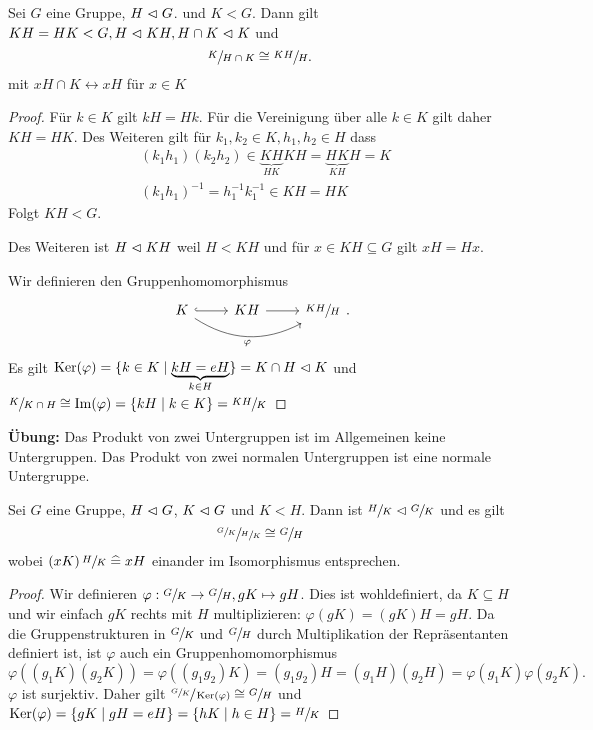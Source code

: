 \begin{corollary}
	Sei $G$ eine Gruppe, $H \vartriangleleft G$. und $K < G$.
	Dann gilt $K H = H K < G, H \vartriangleleft KH, H \cap K \vartriangleleft K $ und 
	\[
	\sfrac{K}{H \cap K} \cong \sfrac{KH}{H}
	.\] 
	mit $x H \cap K \leftrightarrow x H$ für $x \in K$
\end{corollary}

\begin{proof}
	Für $k \in K$ gilt $kH = Hk$. 
	Für die Vereinigung über alle $k \in K$ gilt daher $KH = HK$.
	Des Weiteren gilt für  $k_1, k_2 \in K, h_1,h_2 \in H$ dass
	\begin{align*}
		&(k_1 h_1) (k_2 h_2) \in \underbrace{KH}_{HK} KH = \underbrace{HK}_{KH} H = K\\
		&(k_1 h_1)^{-1} = h_1^{-1} k_1^{-1} \in KH = HK
	\end{align*}
	Folgt $KH < G$.

	Des Weiteren ist $H \vartriangleleft KH$ weil $H < KH$ und für $x \in KH \subseteq G$ gilt $xH = Hx$.

	Wir definieren den Gruppenhomomorphismus
	\[
		\begin{tikzcd}
			K \arrow[r, hook] \arrow[rr, "\varphi"', bend right] & KH \arrow[r] & \sfrac{KH}{H}
		\end{tikzcd}
	.\] 
	Es gilt $\operatorname{Ker}(\varphi) = \{k \in K \mid \underbrace{k H = e H}_{k \in H}\} = K \cap H \vartriangleleft K$
	und $\sfrac{K}{K \cap H} \cong \Im(\varphi) = \{k H \mid k \in K\}  = \sfrac{KH}{K}$
\end{proof}

\textbf{Übung:}
 Das Produkt von zwei Untergruppen ist im Allgemeinen keine Untergruppen.
 Das Produkt von zwei normalen Untergruppen ist eine normale Untergruppe.

 \begin{corollary}
 	Sei $G$ eine Gruppe, $H \vartriangleleft G$, $K \vartriangleleft G$ und $K < H$.
	Dann ist $\sfrac{H}{K} \vartriangleleft \sfrac{G}{K}$ und es gilt
	\[
	\sfrac{\sfrac{G}{K}}{\sfrac{H}{K}} \cong \sfrac{G}{H}
	\] 
	wobei $(xK) \, \sfrac{H}{K} \; \widehat{=} \; x H$ einander im Isomorphismus entsprechen.
 \end{corollary}

\begin{proof}
	Wir definieren $ \varphi: \sfrac{G}{K} \to  \sfrac{G}{H}, gK \mapsto gH$.
	Dies ist wohldefiniert, da $K \subseteq H$ und wir einfach $gK$ rechts mit $H$ multiplizieren:
	$\varphi(gK) = (gK)H = gH$.
	Da die Gruppenstrukturen in $\sfrac{G}{K}$ und $\sfrac{G}{H}$ durch Multiplikation der Repräsentanten definiert ist,
	ist $\varphi$ auch ein Gruppenhomomorphismus
	\[
		\varphi((g_1 K)(g_2 K)) = \varphi((g_1 g_2)K) = (g_1 g_2) H = (g_1 H) (g_2 H) = \varphi(g_1 K) \varphi(g_2 K)
	.\] 
	$\varphi$ ist surjektiv. Daher gilt $\sfrac{\sfrac{G}{K}}{\operatorname{Ker}(\varphi)} \cong \sfrac{G}{H}$ und $\operatorname{Ker}(\varphi) = \{gK \mid gH = e H\} = \{hK \mid h \in H\} = \sfrac{H}{K}$
\end{proof}

